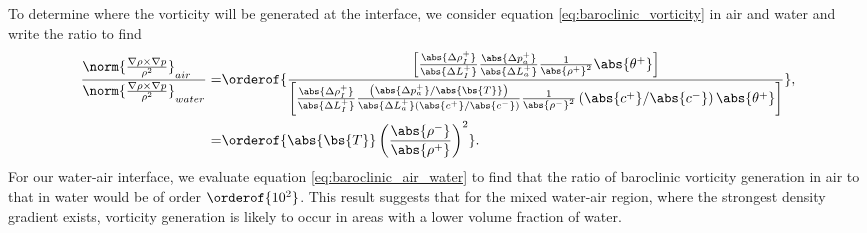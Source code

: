 To determine where the vorticity will be generated at the interface,
we consider equation \eqref{eq:baroclinic_vorticity} in air and water
and write the ratio to find
\begin{align}%
\label{eq:baroclinic_air_water}%
\frac{\norm{\frac{\nabla\rho\times\nabla p}{\rho^2}}_{air\quad}}{\norm{\frac{\nabla\rho\times\nabla p}{\rho^2}}_{water}}
=&\orderof{\frac{\left[\frac{\abs{\Delta \rho_I^+}}{\abs{\Delta L_I^+}}\frac{\abs{\Delta p_a^+}}{\abs{\Delta L_a^+}}\frac{1}{\abs{\rho^+}^2}\abs{\theta^+}\right]}
{\left[\frac{\abs{\Delta \rho_I^+}}{\abs{\Delta L_I^+}}\frac{\left(\abs{\Delta p_a^+}/\abs{\bs{T}}\right)}{\abs{\Delta L_a^+}\left(\abs{c^+}/\abs{c^-}\right)}\frac{1}{\abs{\rho^-}^2}\left(\abs{c^+}/\abs{c^-}\right)\abs{\theta^+}\right]}},\nonumber\\%
=&\orderof{\abs{\bs{T}}\left(\frac{\abs{\rho^-}}{\abs{\rho^+}}\right)^2}.%
\end{align}
For our water-air interface, we evaluate equation
\eqref{eq:baroclinic_air_water} to find that the ratio of baroclinic
vorticity generation in air to that in water would be of order
$\orderof{10^2}$. This result suggests that for the mixed water-air
region, where the strongest density gradient exists, vorticity
generation is likely to occur in areas with a lower volume fraction of
water.


